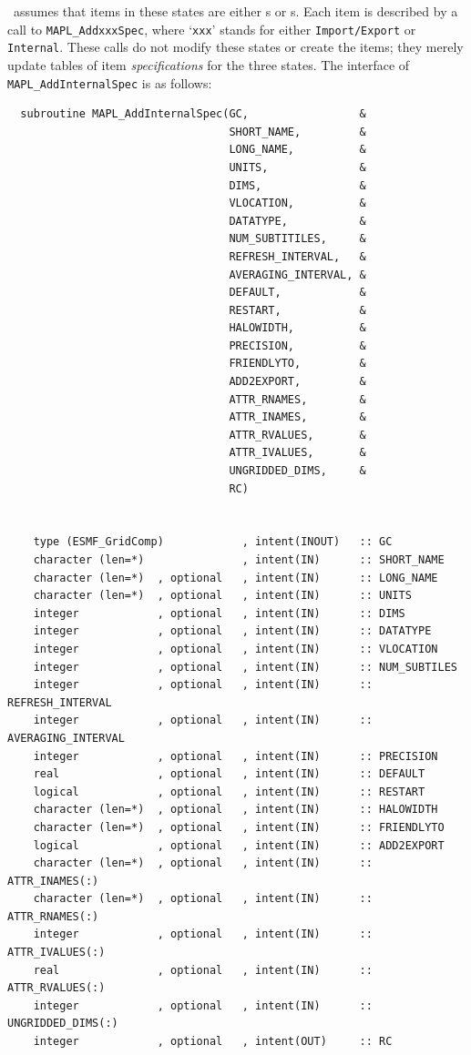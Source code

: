 \ggn\ assumes that items in these states are either \fld s  or \bdl s.
Each item is described by a call to {\tt MAPL\_AddxxxSpec}, where
`{\tt xxx}' stands for either {\tt Import/Export} or {\tt
  Internal}. These calls do not modify these states or create the
items; they merely update tables of item {\em specifications} for the
three states. The interface of \texttt{MAPL\_AddInternalSpec} is as follows:

\begin{verbatim}
  subroutine MAPL_AddInternalSpec(GC,                 &
                                  SHORT_NAME,         &
                                  LONG_NAME,          &
                                  UNITS,              &
                                  DIMS,               &
                                  VLOCATION,          &
                                  DATATYPE,           &
                                  NUM_SUBTITILES,     &
                                  REFRESH_INTERVAL,   &
                                  AVERAGING_INTERVAL, &
                                  DEFAULT,            &
                                  RESTART,            &
                                  HALOWIDTH,          &
                                  PRECISION,          &
                                  FRIENDLYTO,         &
                                  ADD2EXPORT,         &
                                  ATTR_RNAMES,        &
                                  ATTR_INAMES,        &
                                  ATTR_RVALUES,       &
                                  ATTR_IVALUES,       &
                                  UNGRIDDED_DIMS,     &
                                  RC)


    type (ESMF_GridComp)            , intent(INOUT)   :: GC
    character (len=*)               , intent(IN)      :: SHORT_NAME
    character (len=*)  , optional   , intent(IN)      :: LONG_NAME
    character (len=*)  , optional   , intent(IN)      :: UNITS
    integer            , optional   , intent(IN)      :: DIMS
    integer            , optional   , intent(IN)      :: DATATYPE
    integer            , optional   , intent(IN)      :: VLOCATION
    integer            , optional   , intent(IN)      :: NUM_SUBTILES
    integer            , optional   , intent(IN)      :: REFRESH_INTERVAL
    integer            , optional   , intent(IN)      :: AVERAGING_INTERVAL
    integer            , optional   , intent(IN)      :: PRECISION
    real               , optional   , intent(IN)      :: DEFAULT
    logical            , optional   , intent(IN)      :: RESTART
    character (len=*)  , optional   , intent(IN)      :: HALOWIDTH
    character (len=*)  , optional   , intent(IN)      :: FRIENDLYTO
    logical            , optional   , intent(IN)      :: ADD2EXPORT
    character (len=*)  , optional   , intent(IN)      :: ATTR_INAMES(:)
    character (len=*)  , optional   , intent(IN)      :: ATTR_RNAMES(:)
    integer            , optional   , intent(IN)      :: ATTR_IVALUES(:)
    real               , optional   , intent(IN)      :: ATTR_RVALUES(:)
    integer            , optional   , intent(IN)      :: UNGRIDDED_DIMS(:)
    integer            , optional   , intent(OUT)     :: RC
\end{verbatim}

